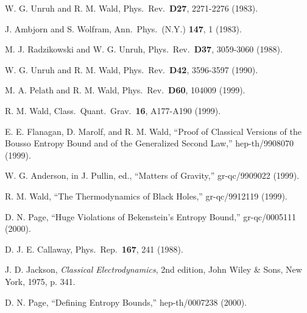 \documentclass[a4paper,12pt]{article}
\begin{document}
\begin{thebibliography}{99}
W. G. Unruh and R. M. Wald,
Phys.\ Rev.\ {\bf D27}, 2271-2276 (1983).

J. Ambjorn and S. Wolfram,
Ann.\ Phys.\ (N.Y.) {\bf 147}, 1 (1983).

M. J. Radzikowski and W. G. Unruh, 
Phys.\ Rev.\ {\bf D37}, 3059-3060 (1988).

W. G. Unruh and R. M. Wald,
Phys.\ Rev.\ {\bf D42}, 3596-3597 (1990).

M. A. Pelath and R. M. Wald,
Phys.\ Rev.\ {\bf D60}, 104009 (1999).

R. M. Wald,
Class.\ Quant.\ Grav.\ {\bf 16}, A177-A190 (1999).

E. E. Flanagan, D. Marolf, and R. M. Wald,
``Proof of Classical Versions of the Bousso Entropy Bound
and of the Generalized Second Law,''
hep-th/9908070 (1999).

W. G. Anderson, in J. Pullin, ed.,
``Matters of Gravity,'' gr-qc/9909022 (1999).

R. M. Wald,
``The Thermodynamics of Black Holes,'' gr-qc/9912119 (1999).

D. N. Page,
``Huge Violations of Bekenstein's Entropy Bound,''
gr-qc/0005111 (2000).

D. J. E. Callaway,
Phys.\ Rep.\ {\bf 167}, 241 (1988).

J. D. Jackson,
{\em Classical Electrodynamics}, 2nd edition,
John Wiley \& Sons, New York, 1975, p. 341.

D. N. Page,
``Defining Entropy Bounds,''
hep-th/0007238 (2000).

\end{thebibliography}
\end{document}
